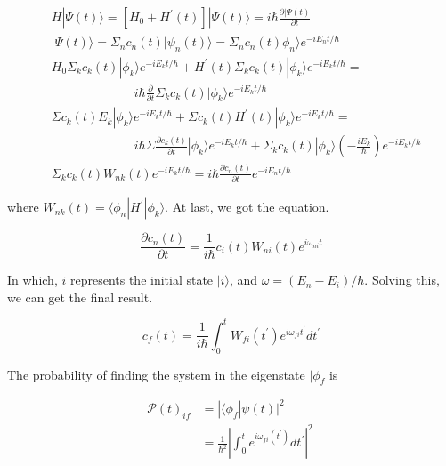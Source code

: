 \documentclass{article}
\begin{document}
		\begin{equation}
		\begin{aligned}
			&H|\Psi(t)\rangle = [H_{0} + H^{'}(t)]|\Psi(t)\rangle = i\hbar\frac{\partial|\Psi(t)}{\partial t}\\
			&|\Psi(t)\rangle = \Sigma_{n}c_{n}(t)|\psi_{n}(t)\rangle = \Sigma_{n}c_{n}(t)\phi_{n}\rangle e^{-iE_{n}t/\hbar}\\
			&H_{0}\Sigma_{k}c_{k}(t)|\phi_{k}\rangle e^{-iE_{k}t/\hbar} + H^{'}(t)\Sigma_{k}c_{k}(t)|\phi_{k}\rangle e^{-iE_{k}t/\hbar} =\\
			&\ \ \ \ \ \ \ \ \ \ \ \ \ \ \ \ \ \ \ \ \ \ \ \ \ \ \ \ \ \ i\hbar\frac{\partial}{\partial t}\Sigma_{k}c_{k}(t)|\phi_{k}\rangle e^{-iE_{k}t/\hbar}\\
			&\Sigma c_{k}(t)E_{k}|\phi_{k}\rangle e^{-iE_{k}t/\hbar} + \Sigma c_{k}(t)H^{'}(t)|\phi_{k}\rangle e^{-iE_{k}t/\hbar} =\\
			&\ \ \ \ \ \ \ \ \ \ \ \ \ \ \ \ \ \ \ \ \ \ \ \ \ \ \ \ \ \ i\hbar\Sigma \frac{\partial c_{k}(t)}{\partial t}|\phi_{k}\rangle e^{-iE_{k}t/\hbar} + \Sigma_{k}c_{k}(t)|\phi_{k}\rangle(-\frac{iE_{k}}{\hbar})e^{-iE_{k}t/\hbar}\\
			&\Sigma_{k}c_{k}(t)W_{nk}(t)e^{-iE_{k}t/\hbar} = i\hbar\frac{\partial c_{n}(t)}{\partial t}e^{-iE_{n}t/\hbar}
		\end{aligned}
		\end{equation}

		where $W_{nk}(t) = \langle\phi_{n}|H^{'}|\phi_{k}\rangle$. At last, we got the equation.

		\begin{equation}
			\frac{\partial c_{n}(t)}{\partial t} = \frac{1}{i\hbar}c_{i}(t)W_{ni}(t)e^{i\omega_{ni}t}
		\end{equation}

		In which, $i$ represents the initial state $|i\rangle$, and $\omega = (E_{n} - E_{i})/\hbar$. Solving this, we can get the final result.

		\begin{equation}
			c_{f}(t) =  \frac{1}{i\hbar}\int_{0}^{t}W_{fi}(t^{'})e^{i\omega_{fi}t^{'}}dt^{'}
		\end{equation}

		The probability of finding the system in the eigenstate $|\phi_{f}$ is

		\begin{equation}
		\begin{aligned}
			\mathscr{P}(t)_{if} &= |\langle\phi_{f}|\psi(t)|^{2}\\
							    &= \frac{1}{\hbar^{2}}|\int_{0}^{t}e^{i\omega_{fi}(t^{'})}dt^{'}|^{2}\
		\end{aligned}
		\end{equation}
\end{document}
